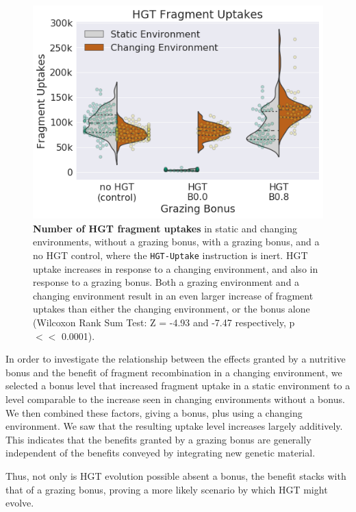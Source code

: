 \documentclass[PhD]{msu-thesis}
\begin{document}
\begin{figure}[h!]
\begin{center}
\includegraphics[width=0.65\columnwidth]{figures/HGT/hgt_fragment_uptake.png}
\caption{ \textbf{Number of HGT fragment uptakes} in static and changing environments, without a grazing bonus, with a grazing bonus, and a no HGT control, where the \texttt{HGT-Uptake} instruction is inert. HGT uptake increases in response to a changing environment, and also in response to a grazing bonus. Both a grazing environment and a changing environment result in an even larger increase of fragment uptakes than either the changing environment, or the bonus alone (Wilcoxon Rank Sum Test: Z = -4.93 and -7.47 respectively, p $<<$ 0.0001).
%
}\label{fig:hgt_fragment_uptake}
\end{center}
\end{figure}

In order to investigate the relationship between the effects granted by a nutritive bonus and the benefit of fragment recombination in a changing environment, we selected a bonus level that increased fragment uptake in a static environment to a level comparable to the increase seen in changing environments without a bonus. We then combined these factors, giving a bonus, plus using a changing environment. We saw that the resulting uptake level increases largely additively. This indicates that the benefits granted by a grazing bonus are generally independent of the benefits conveyed by integrating new genetic material. 

Thus, not only is HGT evolution possible absent a bonus, the benefit stacks with that of a grazing bonus, proving a more likely scenario by which HGT might evolve. %
\end{document}
